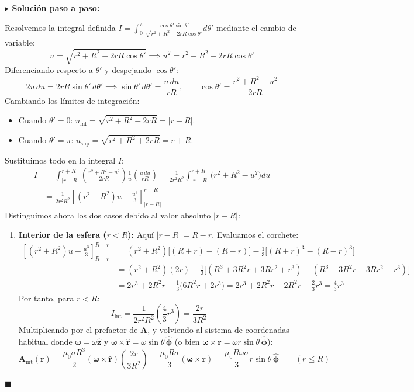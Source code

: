 \documentclass[11pt,a4paper]{book}
\newenvironment{solucion}{%
    \par\medskip\noindent\textbf{\color{blue!65!black}\Large $\blacktriangleright$ Solución paso a paso:}\par\medskip
}{%
    \hfill$\blacksquare$\par\bigskip
}
\newcommand{\rhat}{\hat{\bm{r}}}
\newcommand{\phihat}{\hat{\bm{\phi}}}
\newcommand{\zhat}{\hat{\bm{z}}}
\newcommand{\Avec}{\bm{A}}
\begin{document}
\begin{solucion}
Resolvemos la integral definida $I = \int_{0}^{\pi} \frac{\cos\theta'\sin\theta'}{\sqrt{r^2 + R^2 - 2rR\cos\theta'}} d\theta'$ mediante el cambio de variable:
\begin{equation}
    u = \sqrt{r^2 + R^2 - 2rR\cos\theta'} \implies u^2 = r^2 + R^2 - 2rR\cos\theta'
\end{equation}
Diferenciando respecto a $\theta'$ y despejando $\cos\theta'$:
\begin{equation}
    2u\,du = 2rR\sin\theta'\,d\theta' \implies \sin\theta'\,d\theta' = \frac{u\,du}{rR}, \qquad \cos\theta' = \frac{r^2 + R^2 - u^2}{2rR}
\end{equation}
Cambiando los límites de integración:
\begin{itemize}
    \item Cuando $\theta' = 0$: $u_{\text{inf}} = \sqrt{r^2 + R^2 - 2rR} = |r - R|$.
    \item Cuando $\theta' = \pi$: $u_{\text{sup}} = \sqrt{r^2 + R^2 + 2rR} = r + R$.
\end{itemize}
Sustituimos todo en la integral $I$:
\begin{align}
    I &= \int_{|r-R|}^{r+R} \left(\frac{r^2 + R^2 - u^2}{2rR}\right) \frac{1}{u} \left(\frac{u\,du}{rR}\right) = \frac{1}{2r^2 R^2} \int_{|r-R|}^{r+R} \big(r^2 + R^2 - u^2\big) du \nonumber \\
    &= \frac{1}{2r^2 R^2} \left[ (r^2 + R^2)u - \frac{u^3}{3} \right]_{|r-R|}^{r+R}
\end{align}
Distinguimos ahora los dos casos debido al valor absoluto $|r - R|$:
\begin{enumerate}
    \item \textbf{Interior de la esfera ($r < R$):} Aquí $|r - R| = R - r$. Evaluamos el corchete:
    \begin{align}
        \left[ (r^2 + R^2)u - \frac{u^3}{3} \right]_{R-r}^{R+r} &= (r^2 + R^2)\big[(R+r) - (R-r)\big] - \frac{1}{3}\big[(R+r)^3 - (R-r)^3\big] \nonumber \\
        &= (r^2 + R^2)(2r) - \frac{1}{3}\big[ (R^3 + 3R^2 r + 3R r^2 + r^3) - (R^3 - 3R^2 r + 3R r^2 - r^3) \big] \nonumber \\
        &= 2r^3 + 2R^2 r - \frac{1}{3}\big(6R^2 r + 2r^3\big) = 2r^3 + 2R^2 r - 2R^2 r - \frac{2}{3}r^3 = \frac{4}{3}r^3
    \end{align}
    Por tanto, para $r < R$:
    \begin{equation}
        I_{\text{int}} = \frac{1}{2r^2 R^2}\left(\frac{4}{3}r^3\right) = \frac{2r}{3R^2}
    \end{equation}
    Multiplicando por el prefactor de $\Avec$, y volviendo al sistema de coordenadas habitual donde $\bm{\omega} = \omega\zhat$ y $\bm{\omega} \times \rhat = \omega\sin\theta\,\phihat$ (o bien $\bm{\omega}\times\bm{r} = \omega r \sin\theta\,\phihat$):
    \begin{equation}
        \Avec_{\text{int}}(\bm{r}) = \frac{\mu_0 \sigma R^3}{2} (\bm{\omega} \times \rhat) \left(\frac{2r}{3R^2}\right) = \frac{\mu_0 R \sigma}{3} (\bm{\omega} \times \bm{r}) = \frac{\mu_0 R \omega \sigma}{3} r \sin\theta\,\phihat \qquad (r \le R)
    \end{equation}


\end{enumerate}
\end{solucion}
\end{document}
